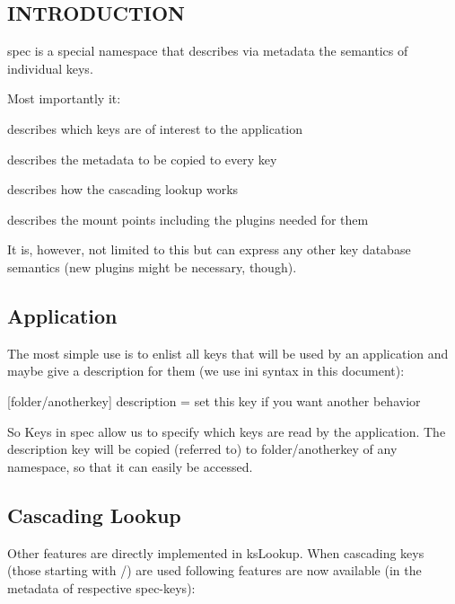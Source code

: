 \subsection*{I\+N\+T\+R\+O\+D\+U\+C\+T\+I\+ON}

spec is a special namespace that describes via metadata the semantics of individual keys.

Most importantly it\+:


\begin{DoxyEnumerate}
\item describes which keys are of interest to the application
\item describes the metadata to be copied to every key
\item describes how the cascading lookup works
\item describes the mount points including the plugins needed for them
\end{DoxyEnumerate}

It is, however, not limited to this but can express any other key database semantics (new plugins might be necessary, though).

\subsection*{Application}

The most simple use is to enlist all keys that will be used by an application and maybe give a description for them (we use ini syntax in this document)\+:


\begin{DoxyCode}
[mykey]

[folder/anotherkey]
description = set this key if you want another behavior
\end{DoxyCode}


So Keys in {\ttfamily spec} allow us to specify which keys are read by the application. The description key will be copied (referred to) to {\ttfamily folder/anotherkey} of any namespace, so that it can easily be accessed.

\subsection*{Cascading Lookup}

Other features are directly implemented in {\ttfamily ks\+Lookup}. When cascading keys (those starting with {\ttfamily /}) are used following features are now available (in the metadata of respective {\ttfamily spec}-\/keys)\+:


